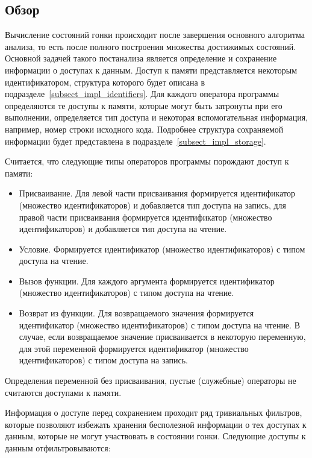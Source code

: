 \subsection{Обзор}
\label{subsect_impl_race_overview}
Вычисление состояний гонки происходит после завершения основного алгоритма анализа, то есть после полного построения множества достижимых состояний.
Основной задачей такого постанализа является определение и сохранение информации о доступах к данным. 
Доступ к памяти представляется некоторым идентификатором, структура которого будет описана в подразделе~\ref{subsect_impl_identifiers}.
Для каждого оператора программы определяются те доступы к памяти, которые могут быть затронуты при его выполнении, определяется тип доступа и некоторая вспомогательная информация, например, номер строки исходного кода.
Подробнее структура сохраняемой информации будет представлена в подразделе~\ref{subsect_impl_storage}.

Считается, что следующие типы операторов программы порождают доступ к памяти:
\begin{itemize}
\item Присваивание. Для левой части присваивания формируется идентификатор (множество идентификаторов) и добавляется тип доступа на запись, для правой части присваивания формируется идентификатор (множество идентификаторов) и добавляется тип доступа на чтение.
\item Условие. Формируется идентификатор (множество идентификаторов) с типом доступа на чтение.
\item Вызов функции. Для каждого аргумента формируется идентификатор (множество идентификаторов) с типом доступа на чтение.
\item Возврат из функции. Для возвращаемого значения формируется идентификатор (множество идентификаторов) с типом доступа на чтение. В случае, если возвращаемое значение присваивается в некоторую переменную, для этой переменной формируется идентификатор (множество идентификаторов) с типом доступа на запись.
\end{itemize}
Определения переменной без присваивания, пустые (служебные) операторы не считаются доступами к памяти.

Информация о доступе перед сохранением проходит ряд тривиальных фильтров, которые позволяют избежать хранения бесполезной информации о тех доступах к данным, которые не могут участвовать в состоянии гонки.
Следующие доступы к данным отфильтровываются:


